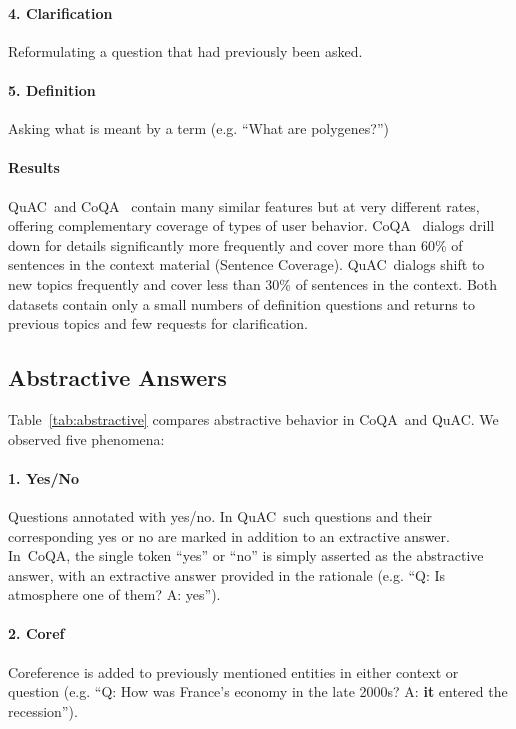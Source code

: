 \documentclass[11pt,a4paper]{article}
\newcommand{\quact}[0]{QuAC}
\newcommand{\coqa}[0]{CoQA}
\begin{document}
    \paragraph{4. Clarification} Reformulating a question that had previously been asked. 
    \vspace{-7pt}
    \paragraph{5. Definition} Asking what is meant by a term (e.g. ``What are polygenes?'')





\paragraph{Results} \quact~and \coqa~ contain many similar features but at very different rates, offering complementary coverage of types of user behavior. 
\coqa~ dialogs drill down for details significantly more frequently and cover more than 60\% of sentences in the context material (Sentence Coverage). \quact~dialogs shift to new topics frequently and cover less than 30\% of sentences in the context.
Both datasets contain only a small numbers of definition questions and returns to previous topics and few requests for clarification.
\subsection{Abstractive Answers}
\label{sec:abstraction}
Table~\ref{tab:abstractive} compares abstractive behavior in \coqa~and \quact. We observed five phenomena: 




\vspace{-7pt}
\paragraph{1. Yes/No} Questions annotated with yes/no. In \quact~such questions and their corresponding yes or no are marked in addition to an extractive answer. In~\coqa, the single token ``yes'' or ``no'' is simply asserted as the abstractive answer, with an extractive answer provided in the rationale (e.g. ``Q: Is atmosphere one of them? A: yes'').
\vspace{-7pt}
\paragraph{2. Coref} Coreference is added to previously mentioned entities in either context or question (e.g. ``Q: How was France's economy in the late 2000s? A: {\bf it} entered the recession''). 
\vspace{-7pt}
\end{document}
